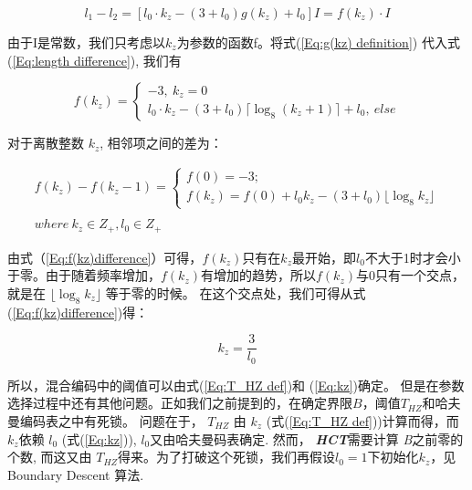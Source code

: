 \begin{equation}\label{Eq:length difference}
  l_1-l_2 = \left[l_0\cdot k_z-(3+l_0)g(k_z)+l_0\right]I=f(k_z)\cdot I
\end{equation}


由于I是常数，我们只考虑以$k_z$为参数的函数f。将式(\ref{Eq:g(kz) definition}) 代入式(\ref{Eq:length difference}), 我们有


\begin{equation}\label{Eq:f(kz) Def}
  f(k_z)=\left\{
    \begin{array}{lr}
        -3,\ k_z=0\\
        l_0\cdot k_z-(3+l_0)\lceil\log_8(k_z+1)\rceil+l_0,\ else
    \end{array}
  \right.
\end{equation}


对于离散整数 $k_z$, 相邻项之间的差为：


\begin{equation}\label{Eq:f(kz)difference}
\begin{array}{lr}
  f(k_z)-f(k_z-1)=\left\{
    \begin{array}{lr}
        f(0)=-3;\\
        f(k_z)=f(0)+l_0k_z-(3+l_0)\lfloor\log_8{k_z}\rfloor
    \end{array}
  \right.\\
  \\
  where \ k_z\in Z_+,l_0\in Z_+
\end{array}
\end{equation}


由式（\ref{Eq:f(kz)difference}）可得，$f(k_z)$只有在$k_z$最开始，即$l_0$不大于1时才会小于零。由于随着频率增加，$f(k_z)$有增加的趋势，所以$f(k_z)$与0只有一个交点，就是在 $\lfloor\log_8{k_z}\rfloor$ 等于零的时候。
在这个交点处，我们可得从式(\ref{Eq:f(kz)difference})得：


\begin{equation}\label{Eq:kz}
  k_z=\frac{3}{l_0}
\end{equation}


所以，混合编码中的阈值可以由式(\ref{Eq:T_HZ def})和 (\ref{Eq:kz})确定。 但是在参数选择过程中还有其他问题。正如我们之前提到的，在确定界限$B$，阈值$T_{HZ}$和哈夫曼编码表之中有死锁。
问题在于， $T_{HZ}$ 由 $k_z$ (式(\ref{Eq:T_HZ def}))计算而得，而$k_z$依赖 $l_0$ (式(\ref{Eq:kz})), $l_0$又由哈夫曼码表确定. 然而， \textbf{\emph{HCT}}需要计算 \emph B之前零的个数, 而这又由 $T_{HZ}$得来。为了打破这个死锁，我们再假设$l_0=1$下初始化$k_z$，见Boundary Descent 算法.

